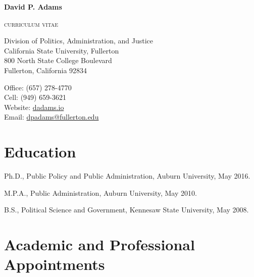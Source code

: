 \documentclass[11pt,letterpaper]{article}
\def\name{David P. Adams}
\renewenvironment{itemize}{
  \begin{list}{}{
    \setlength{\leftmargin}{1.5em}
    \setlength{\itemsep}{0.25em}
    \setlength{\parskip}{0pt}
    \setlength{\parsep}{0.25em}
  }
}{
  \end{list}
}
\begin{document}
    
    
\centerline{\huge \bf \name}
\smallskip
\centerline{\small{\textsc{curriculum vitae}}}

\bigskip

\noindent

\begin{minipage}[t]{0.55\textwidth}
    Division of Politics, Administration, and Justice \\
    California State University, Fullerton \\
    800 North State College Boulevard  \\
    Fullerton, California 92834
\end{minipage}
\hfill
\begin{minipage}[t]{0.4\textwidth}
    Office: \hspace{6em}(657) 278-4770 \\
    Cell: \hspace{6.5em} (949) 659-3621 \\
    Website: \hspace{7.1em}\href{https://dadams.io}{dadams.io} \\
    Email: \hspace{2.1em}\href{mailto:dpadams@fullerton.edu}{dpadams@fullerton.edu}
\end{minipage}


  \section*{Education}

  \begin{itemize}\leftmargin=2pt\itemindent=-15pt
  \item Ph.D., Public Policy and Public Administration, Auburn University, May 2016. \vspace{0.2cm}
  \item M.P.A., Public Administration, Auburn University, May 2010. \vspace{0.2cm}
  \item B.S., Political Science and Government, Kennesaw State University, May 2008.
  \end{itemize}
  
  \section*{Academic and Professional Appointments}
\end{document}
